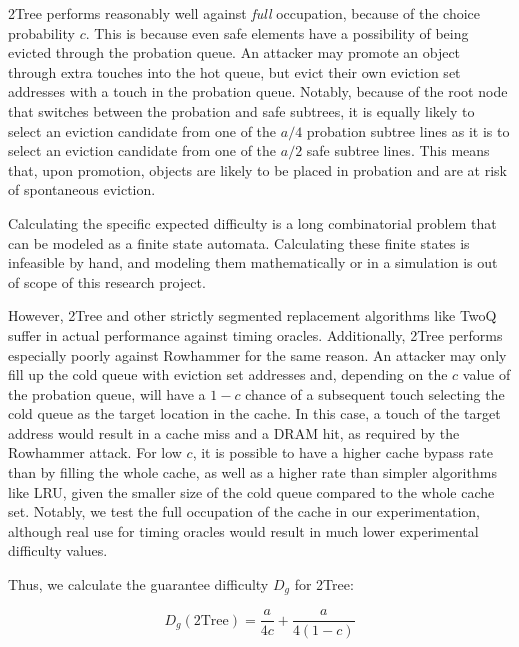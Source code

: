 \documentclass[letterpaper]{article}
\begin{document}

2Tree performs reasonably well against \textit{full} occupation,
because of the choice probability $c$.
This is because even safe elements have a possibility of being evicted through the probation queue.
An attacker may promote an object through extra touches into the hot queue,
but evict their own eviction set addresses with a touch in the probation queue.
Notably, because of the root node that switches between the probation and safe subtrees,
it is equally likely to select an eviction candidate from one of the $a/4$ probation subtree lines
as it is to select an eviction candidate from one of the $a/2$ safe subtree lines.
This means that, upon promotion, objects are likely to be placed in probation
and are at risk of spontaneous eviction.

Calculating the specific expected difficulty is a long combinatorial problem
that can be modeled as a finite state automata.
Calculating these finite states is infeasible by hand,
and modeling them mathematically or in a simulation is out of scope of this research project.

However, 2Tree and other strictly segmented replacement algorithms like TwoQ
suffer in actual performance against timing oracles.
Additionally, 2Tree performs especially poorly against Rowhammer for the same reason.
An attacker may only fill up the cold queue with eviction set addresses
and, depending on the $c$ value of the probation queue, will have a
$1 - c$ chance of a subsequent touch selecting the cold queue as the target location
in the cache.
In this case, a touch of the target address would result in a cache miss and a DRAM hit,
as required by the Rowhammer attack.
For low $c$, it is possible to have a higher cache bypass rate than by filling the whole cache,
as well as a higher rate than simpler algorithms like LRU, given the smaller size of the
cold queue compared to the whole cache set.
Notably, we test the full occupation of the cache in our experimentation,
although real use for timing oracles would result in much lower experimental difficulty values.

Thus, we calculate the guarantee difficulty $D_g$ for 2Tree:

\begin{equation}
	D_g(\text{2Tree}) = \frac{a}{4c} + \frac{a}{4(1-c)}
	\label{eq:2treegd}
\end{equation}
\end{document}

